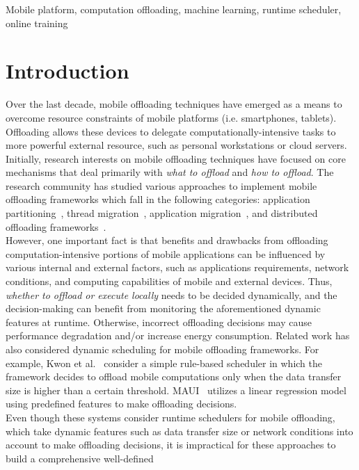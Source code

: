\documentclass[10pt, conference, compsocconf]{IEEEtran}
\begin{document}
\begin{IEEEkeywords}
Mobile platform, computation offloading, machine learning, runtime
scheduler, online training
\end{IEEEkeywords}

\section{Introduction}
%
Over the last decade, mobile offloading techniques have emerged as
a means to overcome resource constraints of mobile platforms (i.e.
smartphones, tablets).
%
Offloading allows these devices to delegate computationally-intensive
tasks to more powerful external resource, such as personal workstations
or cloud servers.
%
Initially, research interests on mobile offloading techniques
have focused on core mechanisms that deal primarily with \textit{what to
offload} and \textit{how to offload}.
%
The research community has studied various approaches to implement mobile
offloading frameworks which fall in the following categories:
application partitioning~\cite{spectra, maui, cuckoo}, thread
migration~\cite{clonecloud, comet}, application migration~\cite{hung},
and distributed offloading frameworks~\cite{mmr, serendipity}.\\
%
\indent However, one important fact is that benefits and drawbacks
from offloading computation-intensive portions of mobile applications
can be influenced by various internal and external factors, such as
applications requirements, network conditions, and computing
capabilities of mobile and external devices. 
%
Thus, \textit{whether to offload or execute locally} needs to be
decided dynamically, and the decision-making can benefit from monitoring
the aforementioned dynamic features at runtime.
%
Otherwise, incorrect offloading decisions may cause performance
degradation and/or increase energy consumption.
%
Related work has also considered dynamic scheduling for mobile
offloading frameworks.
%
For example, Kwon et al.~\cite{kwon} consider a simple rule-based
scheduler in which the framework decides to offload  mobile
computations only when the data transfer size is higher than a certain
threshold.
%
MAUI~\cite{maui} utilizes a linear regression model using predefined
features to make offloading decisions.\\
%
\indent Even though these systems consider runtime schedulers for mobile
offloading, which take dynamic features such as data transfer size or
network conditions into account to make offloading decisions, it is
impractical for these approaches to build a comprehensive well-defined
\end{document}
